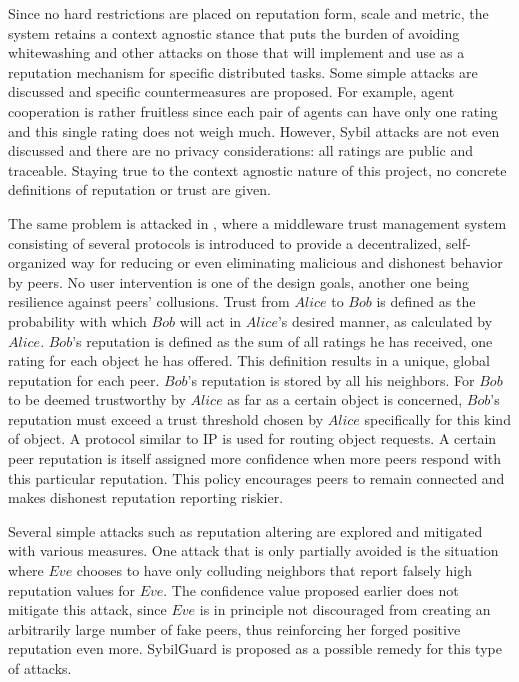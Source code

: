   Since no hard restrictions are placed on reputation form, scale and metric, the system retains a context agnostic stance
  that puts the burden of avoiding whitewashing and other attacks on those that will implement and use \cite{ghkkw} as a
  reputation mechanism for specific distributed tasks. Some simple attacks are discussed and specific countermeasures are
  proposed. For example, agent cooperation is rather fruitless since each pair of agents can have only one rating and this
  single rating does not weigh much. However, Sybil attacks are not even discussed and there are no privacy considerations:
  all ratings are public and traceable. Staying true to the context agnostic nature of this project, no concrete definitions
  of reputation or trust are given.

  The same problem is attacked in \cite{rk}, where a middleware trust management system consisting of several protocols is
  introduced to provide a decentralized, self-organized way for reducing or even eliminating malicious and dishonest behavior
  by peers. No user intervention is one of the design goals, another one being resilience against peers' collusions. Trust
  from $Alice$ to $Bob$ is defined as the probability with which $Bob$ will act in $Alice$'s desired manner, as calculated by
  $Alice$. $Bob$'s reputation is defined as the sum of all ratings he has received, one rating for each object he has
  offered. This definition results in a unique, global reputation for each peer. $Bob$'s reputation is stored by all his
  neighbors. For $Bob$ to be deemed trustworthy by $Alice$ as far as a certain object is concerned, $Bob$'s reputation must
  exceed a trust threshold chosen by $Alice$ specifically for this kind of object. A protocol similar to IP is used for
  routing object requests. A certain peer reputation is itself assigned more confidence when more peers respond with this
  particular reputation. This policy encourages peers to remain connected and makes dishonest reputation reporting riskier.

  Several simple attacks such as reputation altering are explored and mitigated with various measures. One attack that is
  only partially avoided is the situation where $Eve$ chooses to have only colluding neighbors that report falsely high
  reputation values for $Eve$. The confidence value proposed earlier does not mitigate this attack, since $Eve$ is in
  principle not discouraged from creating an arbitrarily large number of fake peers, thus reinforcing her forged positive
  reputation even more. SybilGuard \cite{sybilguard} is proposed as a possible remedy for this type of attacks.


